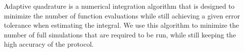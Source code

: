 Adaptive quadrature is a numerical integration algorithm that is designed to minimize the number of function evaluations while still achieving a given error tolerance when estimating the integral. We use this algorithm to minimize the number of full simulations that are required to be run, while still keeping the high accuracy of the protocol.





